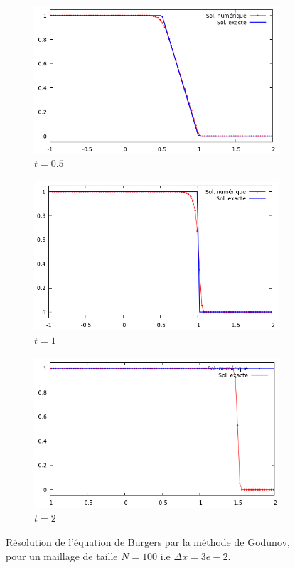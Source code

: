 \documentclass[
	french,
	11pt, %
]{fphw}
\begin{document}
\begin{figure}[H]
	\centering
	\begin{subfigure}{0.32\textwidth}
		\centering
		\includegraphics[width=\textwidth]{Burgers2.png}
		\caption{$t=0.5$}
	\end{subfigure}
	\begin{subfigure}{0.32\textwidth}
		\centering
		\includegraphics[width=\textwidth]{Burgers3.png}
		\caption{$t=1$}
	\end{subfigure}
	\begin{subfigure}{0.32\textwidth}
		\centering
		\includegraphics[width=\textwidth]{Burgers4.png}
		\caption{$t=2$}
		\label{fig:BurgersFaux1}
	\end{subfigure}
	\caption{Résolution de l'équation de Burgers par la méthode de Godunov, pour un maillage de taille $N=100$ i.e $\Delta x = 3e-2$.}
	\label{fig:Burgers1}
\end{figure}
\end{document}

